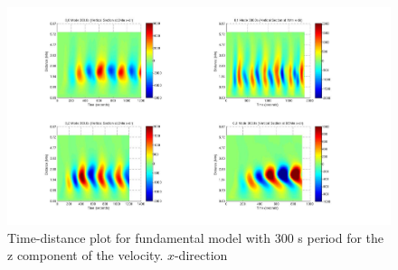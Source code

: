 \documentclass[preprint,authoryear,12pt]{elsarticle}
\begin{document}

\begin{figure}[h]
\includegraphics[scale=0.3]{imagesn/dt_300_vert_x.jpg}
\caption{Time-distance plot for fundamental model with 300 s period for the z component of the velocity. $x$-direction }
\label{Fig7}
\end{figure}






\end{document}
